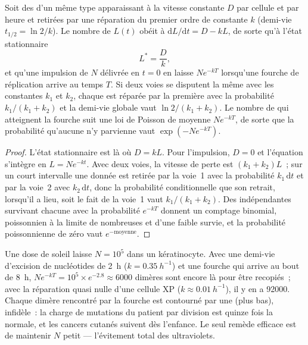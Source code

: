 \begin{theorem}\label{thm:b3:dna-repair:load}
Soit des  d'un même type apparaissant à la vitesse constante $D$
par cellule et par heure et retirées par une réparation du premier
ordre de constante $k$ (demi-vie $t_{1/2} = \ln 2/k$). Le nombre de
 $L(t)$ obéit à $\mathrm{d}L/\mathrm{d}t = D - kL$, de sorte
qu'à l'état stationnaire
\[
L^{*} = \frac{D}{k},
\]
et qu'une impulsion de $N$  délivrée en $t = 0$ en laisse
$N e^{-kT}$ lorsqu'une fourche de réplication arrive au temps $T$. Si
deux voies se disputent la même  avec les constantes $k_{1}$ et
$k_{2}$, chaque  est réparée par la première avec la probabilité
$k_{1}/(k_{1} +
k_{2})$ et la demi-vie globale vaut $\ln 2/(k_{1} + k_{2})$. Le nombre
de  qui atteignent la fourche suit une loi de Poisson de moyenne
$N e^{-kT}$, de sorte que la probabilité qu'aucune n'y parvienne vaut
$\exp(-N e^{-kT})$.
\end{theorem}
\begin{proof}
L'état stationnaire est là où $D = kL$. Pour l'impulsion, $D = 0$ et
l'équation s'intègre en $L = N e^{-kt}$. Avec deux voies, la vitesse de
perte est $(k_{1} + k_{2})L$~; sur un court intervalle une 
donnée est retirée par la voie~1 avec la probabilité
$k_{1}\,\mathrm{d}t$ et par la voie~2 avec $k_{2}\,\mathrm{d}t$, donc
la probabilité conditionnelle que son retrait, lorsqu'il a lieu, soit
le fait de la voie~1 vaut $k_{1}/(k_{1} +
k_{2})$. Des  indépendantes survivant chacune avec la
probabilité $e^{-kT}$ donnent un comptage binomial, poissonnien à la
limite de nombreuses  et d'une faible survie, et la probabilité
poissonnienne de zéro vaut $e^{-\text{moyenne}}$.
\end{proof}

\begin{example}\label{ex:b3:dna-repair:xp}
Une dose de soleil laisse $N = 10^{5}$  dans un
kératinocyte. Avec une demi-vie d'excision de nucléotides de \qty{2}{h}
($k =
\qty{0.35}{h^{-1}}$) et une fourche qui arrive au bout de \qty{8}{h},
$N e^{-kT} =
10^{5}\times e^{-2.8} \approx 6000$ dimères sont encore là pour être
recopiés~; avec la réparation quasi nulle d'une cellule XP ($k \approx
\qty{0.01}{h^{-1}}$), il y en a \num{92000}. Chaque dimère rencontré
par la fourche est contourné par une  (plus
bas), infidèle~: la charge de mutations du patient par division est
quinze fois la normale, et les cancers cutanés suivent dès l'enfance.
Le seul remède efficace est de maintenir $N$ petit --- l'évitement
total des ultraviolets.
\end{example}

